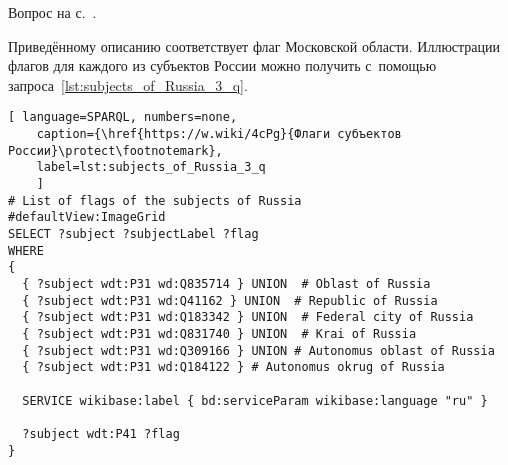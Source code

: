 \newpage
\begin{task}
\label{answer:subjects_of_Russia_3}
    \AnswerBackref Вопрос на с.~\pageref{lst:oblast-of-Russia}.

    Приведённому описанию соответствует флаг Московской области. 
    Иллюстрации флагов для каждого из субъектов России 
    можно получить с~помощью запроса~\ref{lst:subjects_of_Russia_3_q}.
	
	\begin{lstlisting}[ language=SPARQL, numbers=none,
	caption={\href{https://w.wiki/4cPg}{Флаги субъектов России}\protect\footnotemark},
	label=lst:subjects_of_Russia_3_q
	]
# List of flags of the subjects of Russia
#defaultView:ImageGrid
SELECT ?subject ?subjectLabel ?flag
WHERE
{
  { ?subject wdt:P31 wd:Q835714 } UNION  # Oblast of Russia
  { ?subject wdt:P31 wd:Q41162 } UNION  # Republic of Russia
  { ?subject wdt:P31 wd:Q183342 } UNION  # Federal city of Russia
  { ?subject wdt:P31 wd:Q831740 } UNION  # Krai of Russia
  { ?subject wdt:P31 wd:Q309166 } UNION # Autonomus oblast of Russia
  { ?subject wdt:P31 wd:Q184122 } # Autonomus okrug of Russia
  
  SERVICE wikibase:label { bd:serviceParam wikibase:language "ru" }
   
  ?subject wdt:P41 ?flag
}
\end{lstlisting}
\end{task}



